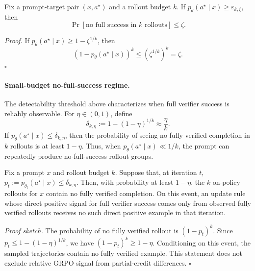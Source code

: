 \begin{lemma}
\label{lem:detectability}
Fix a prompt-target pair $(x,a^\star)$ and a rollout budget $k$. If
$p_\theta(a^\star\mid x)\ge \varepsilon_{k,\zeta}$, then
\begin{equation}
    \Pr[\text{no full success in $k$ rollouts}]
    \le
    \zeta .
\end{equation}
\end{lemma}

\noindent\emph{Proof.}
If $p_\theta(a^\star\mid x)\ge 1-\zeta^{1/k}$, then
\[
    \left(1-p_\theta(a^\star\mid x)\right)^k
    \le
    (\zeta^{1/k})^k
    =
    \zeta .
\]
\hfill$\square$

\paragraph{Small-budget no-full-success regime.}
The detectability threshold above characterizes when full verifier success is reliably observable. For
$\eta\in(0,1)$, define
\begin{equation}
    \delta_{k,\eta}
    :=
    1-(1-\eta)^{1/k}
    \approx
    \frac{\eta}{k}.
\end{equation}
If $p_\theta(a^\star\mid x)\le \delta_{k,\eta}$, then the probability of seeing no fully verified
completion in $k$ rollouts is at least $1-\eta$. Thus, when $p_\theta(a^\star\mid x)\ll 1/k$,
the prompt can repeatedly produce no-full-success rollout groups.

\begin{theorem}
\label{thm:rlvr-barrier}
Fix a prompt $x$ and rollout budget $k$. Suppose that, at iteration $t$,
$p_t:=p_{\theta_t}(a^\star\mid x)\le \delta_{k,\eta}$. Then, with probability at least $1-\eta$,
the $k$ on-policy rollouts for $x$ contain no fully verified completion. On this event, an update rule
whose direct positive signal for full verifier success comes only from observed fully verified rollouts
receives no such direct positive example in that iteration.
\end{theorem}

\noindent\emph{Proof sketch.}
The probability of no fully verified rollout is $(1-p_t)^k$. Since
$p_t\le 1-(1-\eta)^{1/k}$, we have $(1-p_t)^k\ge 1-\eta$. Conditioning on this event, the sampled
trajectories contain no fully verified example. This statement does not exclude relative GRPO signal
from partial-credit differences. \hfill$\square$

